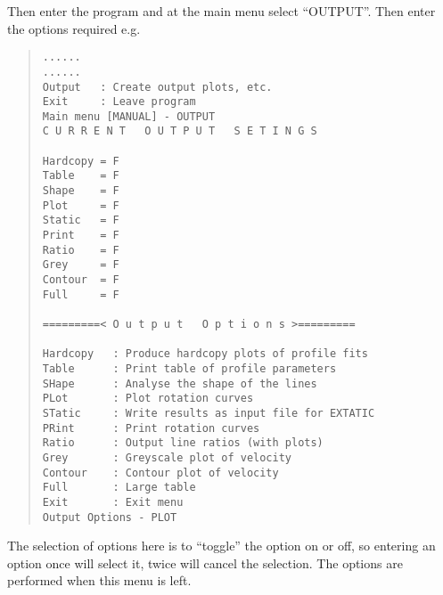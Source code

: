 Then enter the program and at the main menu select ``OUTPUT''. Then
enter the options required e.g.\
\begin{quote}\begin{verbatim}
......
......
Output   : Create output plots, etc.
Exit     : Leave program
Main menu [MANUAL] - OUTPUT
C U R R E N T   O U T P U T   S E T I N G S
 
Hardcopy = F
Table    = F
Shape    = F
Plot     = F
Static   = F
Print    = F
Ratio    = F
Grey     = F
Contour  = F
Full     = F
 
=========< O u t p u t   O p t i o n s >=========
 
Hardcopy   : Produce hardcopy plots of profile fits
Table      : Print table of profile parameters
SHape      : Analyse the shape of the lines
PLot       : Plot rotation curves
STatic     : Write results as input file for EXTATIC
PRint      : Print rotation curves
Ratio      : Output line ratios (with plots)
Grey       : Greyscale plot of velocity
Contour    : Contour plot of velocity
Full       : Large table
Exit       : Exit menu
Output Options - PLOT
\end{verbatim}\end{quote}
The selection of options here is to ``toggle'' the option on or off,
so entering an option once will select it, twice will cancel the
selection. The options are performed when this menu is left.
